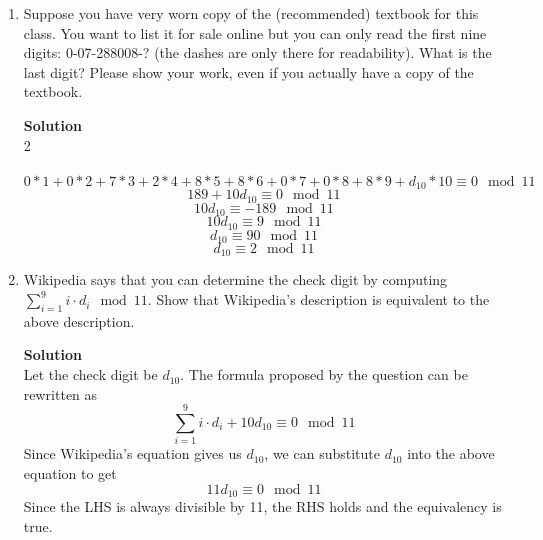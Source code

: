 \documentclass[11pt]{article}
\newenvironment{Parts}{\begin{enumerate}[label=(\alph*)]}{\end{enumerate}}
\newcommand*{\Part}{\item}
\newenvironment{Answer}{\vspace{10pt}\begin{mdframed}\textbf{Solution}\\}{\end{mdframed}\vfill\pagebreak[3]}
\newenvironment{Answer}{\vspace{10pt}}{\vfill\pagebreak[3]}
\begin{document}
\begin{Parts}
	\Part Suppose you have very worn copy of the (recommended) textbook for this class. You want to list it for sale online but you can only read the first nine digits: 0-07-288008-? (the dashes are only there for readability). What is the last digit? Please show your work, even if you actually have a copy of the textbook.\\
	\begin{Answer}
	
	    2
	    \\
	    \\
		$$0*1+0*2+7*3+2*4+8*5+8*6+0*7+0*8+8*9+d_{10}*10 \equiv 0 \mod 11$$
		$$189+10d_{10} \equiv 0 \mod 11$$
		$$10d_{10} \equiv -189 \mod 11$$
		$$10d_{10} \equiv 9 \mod 11$$
		$$d_{10} \equiv 90 \mod 11$$
		$$d_{10} \equiv 2 \mod 11$$
	\end{Answer}
		
	\Part Wikipedia says that you can determine the check digit by computing $\sum_{i=1}^9 i\cdot d_i \mod 11$. Show that Wikipedia's description is equivalent to the above description. \\
	\begin{Answer}
	Let the check digit be $d_{10}$. The formula proposed by the question can be rewritten as $$\sum_{i=1}^9 i\cdot d_i+10d_{10} \equiv 0 \mod 11$$ Since Wikipedia's equation gives us $d_{10}$, we can substitute $d_{10}$ into the above equation to get $$ 11d_{10} \equiv 0 \mod 11$$ Since the LHS is always divisible by 11, the RHS holds and the equivalency is true.
		

\end{Answer}
\end{Parts}
\end{document}
